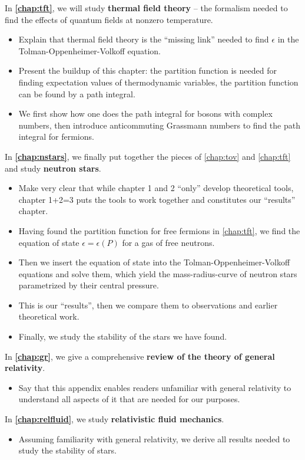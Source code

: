 In \textbf{\cref{chap:tft}}, we will study \textbf{thermal field theory} -- the formalism needed to find the effects of quantum fields at nonzero temperature.
\begin{itemize}
\item Explain that thermal field theory is the ``missing link'' needed to find $\epsilon$ in the Tolman-Oppenheimer-Volkoff equation.
\item Present the buildup of this chapter: the partition function is needed for finding expectation values of thermodynamic variables, the partition function can be found by a path integral.
\item We first show how one does the path integral for bosons with complex numbers, then introduce anticommuting Grassmann numbers to find the path integral for fermions.
\end{itemize}

In \textbf{\cref{chap:nstars}}, we finally put together the pieces of \cref{chap:tov} and \cref{chap:tft} and study \textbf{neutron stars}.
\begin{itemize}
\item Make very clear that while chapter 1 and 2 ``only'' develop theoretical tools, chapter 1+2=3 puts the tools to work together and constitutes our ``results'' chapter.
\item Having found the partition function for free fermions in \cref{chap:tft}, we find the equation of state $\epsilon = \epsilon(P)$ for a gas of free neutrons.
\item Then we insert the equation of state into the Tolman-Oppenheimer-Volkoff equations and solve them, which yield the mass-radius-curve of neutron stars parametrized by their central pressure.
\item This is our ``results'', then we compare them to observations and earlier theoretical work.
\item Finally, we study the stability of the stars we have found.
\end{itemize}

In \textbf{\cref{chap:gr}}, we give a comprehensive \textbf{review of the theory of general relativity}.
\begin{itemize}
\item Say that this appendix enables readers unfamiliar with general relativity to understand all aspects of it that are needed for our purposes.
\end{itemize}

In \textbf{\cref{chap:relfluid}}, we study \textbf{relativistic fluid mechanics}.
\begin{itemize}
\item Assuming familiarity with general relativity, we derive all results needed to study the stability of stars.
\end{itemize}

